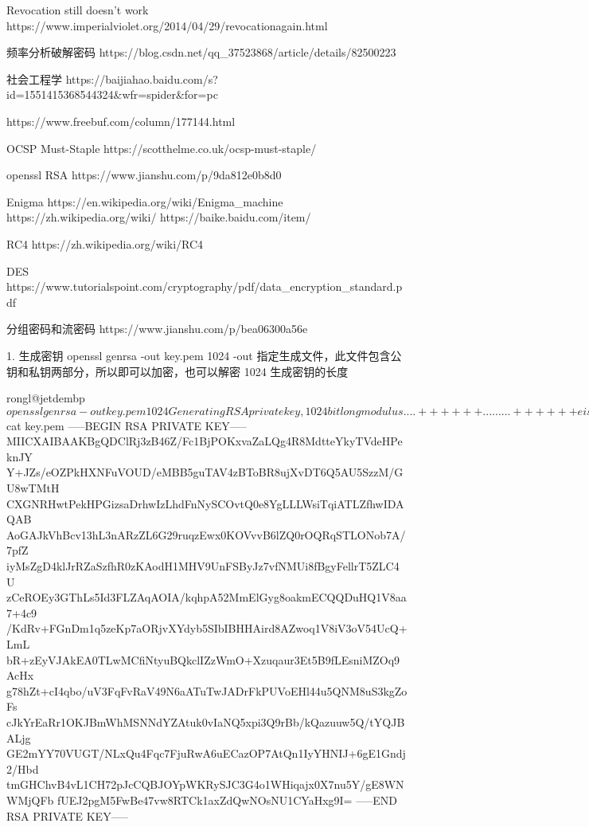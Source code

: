 
Revocation still doesn't work
https://www.imperialviolet.org/2014/04/29/revocationagain.html

频率分析破解密码
https://blog.csdn.net/qq_37523868/article/details/82500223

社会工程学
https://baijiahao.baidu.com/s?id=1551415368544324&wfr=spider&for=pc


https://www.freebuf.com/column/177144.html


OCSP Must-Staple
https://scotthelme.co.uk/ocsp-must-staple/


openssl RSA
https://www.jianshu.com/p/9da812e0b8d0

Enigma
https://en.wikipedia.org/wiki/Enigma_machine
https://zh.wikipedia.org/wiki/%
https://baike.baidu.com/item/%

RC4
https://zh.wikipedia.org/wiki/RC4

DES
https://www.tutorialspoint.com/cryptography/pdf/data_encryption_standard.pdf

分组密码和流密码
https://www.jianshu.com/p/bea06300a56e


1. 生成密钥
openssl genrsa -out key.pem 1024
    -out 指定生成文件，此文件包含公钥和私钥两部分，所以即可以加密，也可以解密
    1024 生成密钥的长度

    rongl@jetdembp ~ $ openssl genrsa -out key.pem 1024
    Generating RSA private key, 1024 bit long modulus
    ....++++++
    .........++++++
    e is 65537 (0x10001)
    rongl@jetdembp ~ $ cat key.pem
    -----BEGIN RSA PRIVATE KEY-----
    MIICXAIBAAKBgQDClRj3zB46Z/Fc1BjPOKxvaZaLQg4R8MdtteYkyTVdeHPeknJY
    Y+JZs/eOZPkHXNFuVOUD/eMBB5guTAV4zBToBR8ujXvDT6Q5AU5SzzM/GU8wTMtH
    CXGNRHwtPekHPGizsaDrhwIzLhdFnNySCOvtQ0e8YgLLLWsiTqiATLZfhwIDAQAB
    AoGAJkVhBcv13hL3nARzZL6G29ruqzEwx0KOVvvB6lZQ0rOQRqSTLONob7A/7pfZ
    iyMsZgD4klJrRZaSzfhR0zKAodH1MHV9UnFSByJz7vfNMUi8fBgyFellrT5ZLC4U
    zCeROEy3GThLs5Id3FLZAqAOIA/kqhpA52MmElGyg8oakmECQQDuHQ1V8aa7+4c9
    /KdRv+FGnDm1q5zeKp7aORjvXYdyb5SIbIBHHAird8AZwoq1V8iV3oV54UcQ+LmL
    bR+zEyVJAkEA0TLwMCfiNtyuBQkclIZzWmO+Xzuqaur3Et5B9fLEsniMZOq9AcHx
    g78hZt+cI4qbo/uV3FqFvRaV49N6aATuTwJADrFkPUVoEHl44u5QNM8uS3kgZoFs
    cJkYrEaRr1OKJBmWhMSNNdYZAtuk0vIaNQ5xpi3Q9rBb/kQazuuw5Q/tYQJBALjg
    GE2mYY70VUGT/NLxQu4Fqc7FjuRwA6uECazOP7AtQn1IyYHNIJ+6gE1Gndj2/Hbd
    tmGHChvB4vL1CH72pJcCQBJOYpWKRySJC3G4o1WHiqajx0X7nu5Y/gE8WNWMjQFb
    fUEJ2pgM5FwBe47vw8RTCk1axZdQwNOsNU1CYaHxg9I=
    -----END RSA PRIVATE KEY-----



